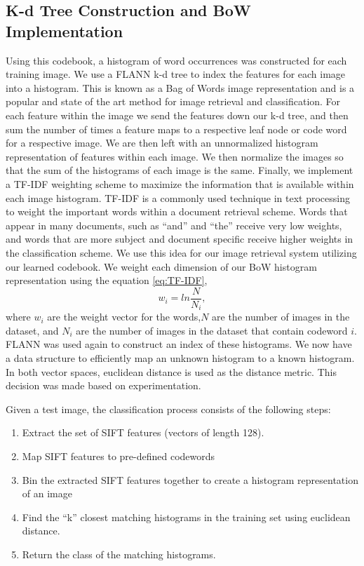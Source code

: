 \subsection{K-d Tree Construction and BoW Implementation}
Using this codebook, a histogram of word occurrences was constructed for each training image. 
We use a FLANN k-d tree to index the features for each image into a histogram.
This is known as a Bag of Words image representation and is a popular and state of the art method for image retrieval and classification.
For each feature within the image we send the features down our k-d tree, and then sum the number of times a feature maps to a respective leaf node or code word for a respective image.
We are then left with an unnormalized histogram representation of features within each image.
We then normalize the images so that the sum of the histograms of each image is the same.
Finally, we implement a TF-IDF weighting scheme to maximize the information that is available within each image histogram.
TF-IDF is a commonly used technique in text processing to weight the important words within a document retrieval scheme.  
Words that appear in many documents, such as ``and'' and ``the'' receive very low weights, and words that are more subject and document specific receive higher weights in the classification scheme.
We use this idea for our image retrieval system utilizing our learned codebook.
We weight each dimension of our BoW histogram representation using the equation \ref{eq:TF-IDF},
\begin{equation}
\label{eq:TF-IDF}
w_{i} = ln\frac{N}{N_{i}},
\end{equation}
where $w_i$ are the weight vector for the words,$N$  are the number of images in the dataset, and $N_i$ are the number of images in the dataset that contain codeword $i$.
FLANN was used again to construct an index of these histograms. 
We now have a data structure to efficiently map an unknown histogram to a known histogram.
In both vector spaces, euclidean distance is used as the distance metric. 
This decision was made based on experimentation.

Given a test image, the classification process consists of the following steps:
\begin{enumerate}
\item Extract the set of SIFT features (vectors of length 128).

\item Map SIFT features to pre-defined codewords

\item Bin the extracted SIFT features together to create a histogram representation of an image

\item Find the ``k'' closest matching histograms in the training set using euclidean distance.

\item Return the class of the matching histograms.
\end{enumerate}





